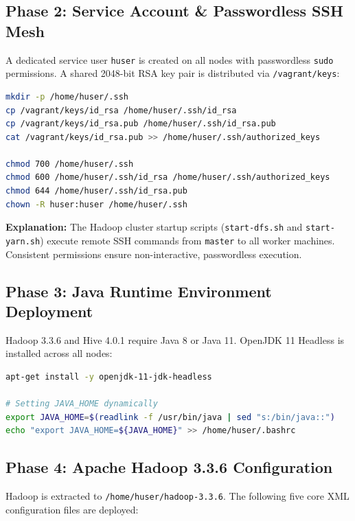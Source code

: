 \documentclass[11pt,a4paper]{article}
\begin{document}
\subsection{Phase 2: Service Account \& Passwordless SSH Mesh}
A dedicated service user \texttt{huser} is created on all nodes with passwordless \texttt{sudo} permissions. A shared 2048-bit RSA key pair is distributed via \texttt{/vagrant/keys}:
\begin{lstlisting}[language=bash, caption={SSH Key Installation Commands}]
mkdir -p /home/huser/.ssh
cp /vagrant/keys/id_rsa /home/huser/.ssh/id_rsa
cp /vagrant/keys/id_rsa.pub /home/huser/.ssh/id_rsa.pub
cat /vagrant/keys/id_rsa.pub >> /home/huser/.ssh/authorized_keys

chmod 700 /home/huser/.ssh
chmod 600 /home/huser/.ssh/id_rsa /home/huser/.ssh/authorized_keys
chmod 644 /home/huser/.ssh/id_rsa.pub
chown -R huser:huser /home/huser/.ssh
\end{lstlisting}
\textbf{Explanation:} The Hadoop cluster startup scripts (\texttt{start-dfs.sh} and \texttt{start-yarn.sh}) execute remote SSH commands from \texttt{master} to all worker machines. Consistent permissions ensure non-interactive, passwordless execution.

\subsection{Phase 3: Java Runtime Environment Deployment}
Hadoop 3.3.6 and Hive 4.0.1 require Java 8 or Java 11. OpenJDK 11 Headless is installed across all nodes:
\begin{lstlisting}[language=bash, caption={Java Installation and Environment Variables}]
apt-get install -y openjdk-11-jdk-headless

# Setting JAVA_HOME dynamically
export JAVA_HOME=$(readlink -f /usr/bin/java | sed "s:/bin/java::")
echo "export JAVA_HOME=${JAVA_HOME}" >> /home/huser/.bashrc
\end{lstlisting}

\subsection{Phase 4: Apache Hadoop 3.3.6 Configuration}
Hadoop is extracted to \texttt{/home/huser/hadoop-3.3.6}. The following five core XML configuration files are deployed:
\end{document}
